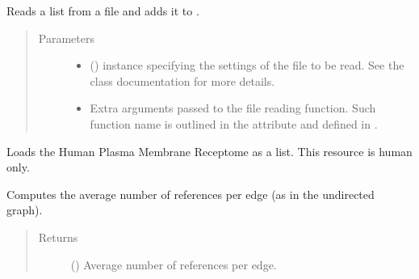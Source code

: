\documentclass[letterpaper,10pt,english]{sphinxmanual}
\begin{document}
\begin{fulllineitems}
\begin{fulllineitems}
\label{\detokenize{main:pypath.main.PyPath.read_list_file}}
Reads a list from a file and adds it to
.
\begin{quote}\begin{description}
\item[{Parameters}] \leavevmode\begin{itemize}
\item {} 
 () \textendash{}  instance specifying
the settings of the file to be read. See the class
documentation for more details.

\item {} 
 \textendash{} 
Extra arguments passed to the file reading function. Such
function name is outlined in the
 attribute and
defined in .


\end{itemize}

\end{description}\end{quote}

\end{fulllineitems}


\begin{fulllineitems}
\label{\detokenize{main:pypath.main.PyPath.receptors_list}}
Loads the Human Plasma Membrane Receptome as a list. This
resource is human only.

\end{fulllineitems}


\begin{fulllineitems}
\label{\detokenize{main:pypath.main.PyPath.reference_edge_ratio}}
Computes the average number of references per edge (as in the
undirected graph).
\begin{quote}\begin{description}
\item[{Returns}] \leavevmode
() \textendash{} Average number of references per edge.


\end{description}
\end{quote}
\end{fulllineitems}
\end{fulllineitems}
\end{document}
